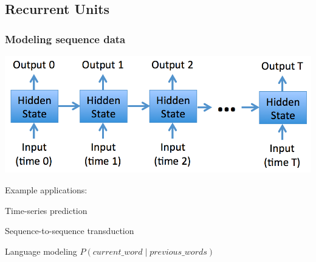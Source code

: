 \subsection[Recurrent Units]{Recurrent Units}

\begin{frame}
\frametitle{Modeling sequence data}
\centerline{\includegraphics[scale=0.3]{figs/sequencemodel}}
\bi
\pause
\item Example applications:
  
	\bi 
        \item Time-series prediction
        \item Sequence-to-sequence transduction
	\item Language modeling $P(current\_word \mid previous\_words)$
	\ei
\ei
\end{frame}




